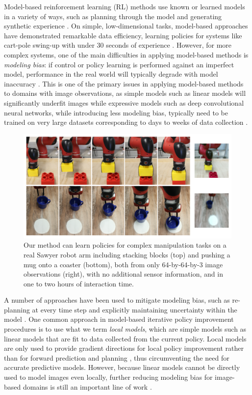 Model-based reinforcement learning (RL) methods use known or learned models in a variety of ways, such as planning through the model and generating synthetic experience \citep{dyna,rl-robotics-survey}. On simple, low-dimensional tasks, model-based approaches have demonstrated remarkable data efficiency, learning policies for systems like cart-pole swing-up with under 30 seconds of experience \citep{pilco,ode}. However, for more complex systems, one of the main difficulties in applying model-based methods is \emph{modeling bias}: if control or policy learning is performed against an imperfect model, performance in the real world will typically degrade with model inaccuracy \citep{pilco}. This is one of the primary issues in applying model-based methods to domains with image observations, as simple models such as linear models will significantly underfit images while expressive models such as deep convolutional neural networks, while introducing less modeling bias, typically need to be trained on very large datasets corresponding to days to weeks of data collection \citep{dvf,l2g,l2p}.

\begin{figure}
    \centering
    \includegraphics[width=0.9\linewidth]{img/solar/diag.png}
    \caption{Our method can learn policies for complex manipulation tasks on a real Sawyer robot arm including stacking blocks (top) and pushing a mug onto a coaster (bottom), both from only \mbox{64-by-64-by-3} image observations (right), with no additional sensor information, and in one to two hours of interaction time.}
    \label{fig:diag}
    \vspace{-.5em}
\end{figure}

A number of approaches have been used to mitigate modeling bias, such as re-planning at every time step \citep{mpc,nn-dyn} and explicitly maintaining uncertainty within the model \citep{pilco,pets}. One common approach in model-based iterative policy improvement procedures is to use what we term \emph{local models}, which are simple models such as linear models that are fit to data collected from the current policy. Local models are only used to provide gradient directions for local policy improvement rather than for forward prediction and planning \citep{ilqg,mfcgps}, thus circumventing the need for accurate predictive models. However, because linear models cannot be directly used to model images even locally, further reducing modeling bias for image-based domains is still an important line of work \citep{dvf,e2c}.

